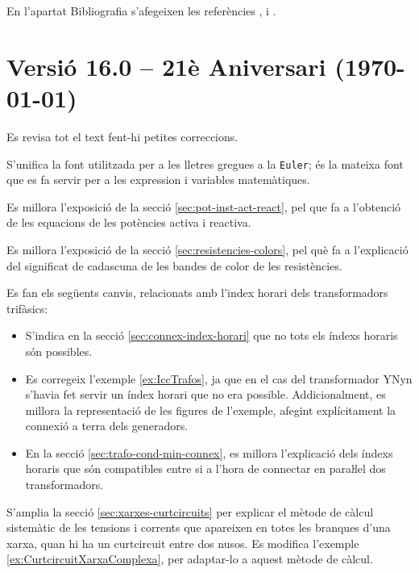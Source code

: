 En l'apartat Bibliografia s'afegeixen les referències \cite{KRE}, \cite{SAL}  i \cite{MGIO}.


\section*{Versió 16.0 -- 21è Aniversari (\today)}

Es revisa tot el text fent-hi petites correccions.

S'unifica la font utilitzada per a les lletres gregues a la \texttt{Euler}; és la mateixa font que es fa servir per a les expression i variables matemàtiques.

Es millora l'exposició de la secció \ref{sec:pot-inst-act-react}, pel que fa a  l'obtenció de les equacions de les potències activa i reactiva.

Es millora l'exposició de la secció \ref{sec:resistencies-colors}, pel què fa a l'explicació del significat de cadascuna de les bandes de color de les resistències.

Es fan els següents canvis, relacionats amb l'index horari dels transformadors trifàsics:
\begin{itemize}
    \item S'indica en la secció \ref{sec:connex-index-horari} que no  tots els índexs horaris són possibles.
    \item Es corregeix l'exemple \ref{ex:IccTrafos}, ja que en el cas del transformador YNyn s'havia fet servir un índex horari que no era possible. Addicionalment, es millora la representació de les figures de l'exemple, afegint explícitament la connexió a terra dels generadors.
    \item En la secció \ref{sec:trafo-cond-min-connex}, es millora l'explicació  dels índexs horaris que són compatibles entre si a l'hora de connectar en paraŀlel dos transformadors.
\end{itemize}

S'amplia la secció \ref{sec:xarxes-curtcircuits} per explicar el mètode de càlcul sistemàtic de les tensions i corrents que apareixen en totes les branques d'una xarxa, quan hi ha un curtcircuit entre dos nusos.
Es modifica l'exemple \ref{ex:CurtcircuitXarxaComplexa}, per adaptar-lo a aquest mètode de càlcul.

